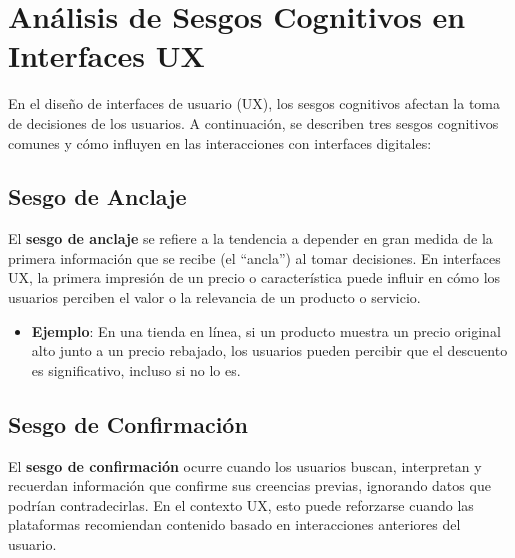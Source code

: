     \restoregeometry %

    \clearpage
    \tableofcontents

    \clearpage
    \listoffigures

    \clearpage


    \clearpage
    \vspace*{6pt}
	\centerline{\textbf{\huge \theTitle}}
    \vspace*{8pt}


	\section{Análisis de Sesgos Cognitivos en Interfaces UX}

	En el diseño de interfaces de usuario (UX), los sesgos cognitivos afectan la
	toma de decisiones de los usuarios. A continuación, se describen tres sesgos
	cognitivos comunes y cómo influyen en las interacciones con interfaces
	digitales:

	\subsection{Sesgo de Anclaje}

	El \textbf{sesgo de anclaje} se refiere a la tendencia a depender en gran
	medida de la primera información que se recibe (el ``ancla'') al tomar
	decisiones. En interfaces UX, la primera impresión de un precio o
	característica puede influir en cómo los usuarios perciben el valor o la
	relevancia de un producto o servicio.

	\begin{itemize}
		\item \textbf{Ejemplo}: En una tienda en línea, si un producto muestra un
			precio original alto junto a un precio rebajado, los usuarios pueden percibir
			que el descuento es significativo, incluso si no lo es.
	\end{itemize}

	\subsection{Sesgo de Confirmación}

	El \textbf{sesgo de confirmación} ocurre cuando los usuarios buscan,
	interpretan y recuerdan información que confirme sus creencias previas, ignorando
	datos que podrían contradecirlas. En el contexto UX, esto puede reforzarse cuando
	las plataformas recomiendan contenido basado en interacciones anteriores del usuario.

